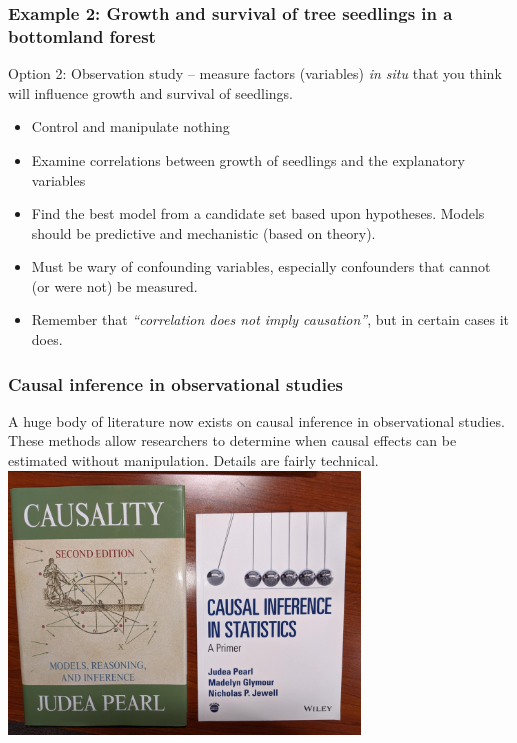 \documentclass[color=usenames,dvipsnames]{beamer}\usepackage[]{graphicx}\usepackage[]{color}
\begin{document}
\begin{frame}
  \frametitle{Example 2: Growth and survival of
    tree seedlings in a bottomland forest}
  Option 2: Observation study -- measure factors (variables) {\it in
    situ} that you think will influence growth and survival of seedlings. 
  \vspace{6pt}
  \begin{itemize}
    \item Control and manipulate nothing
    \item Examine correlations between growth of seedlings and
      the explanatory variables
    \item Find the best model from a candidate set based upon
      hypotheses. Models should be predictive and
      mechanistic (based on theory).
    \item Must be wary of confounding variables, especially
      confounders that cannot (or were not) be measured.
    \item Remember that {\it ``correlation does not imply
        causation''}, but in certain cases it does. 
  \end{itemize}
\end{frame}



\begin{frame}
  \frametitle{Causal inference in observational studies}
  \small
  A huge body of literature now exists on causal inference in
  observational studies. These methods allow researchers to determine
  when causal effects can be estimated without manipulation. Details
  are fairly technical. \\ 
  \vfill
  \centering
  \includegraphics[width=0.7\textwidth]{pearl} \\
\end{frame}
\end{document}
